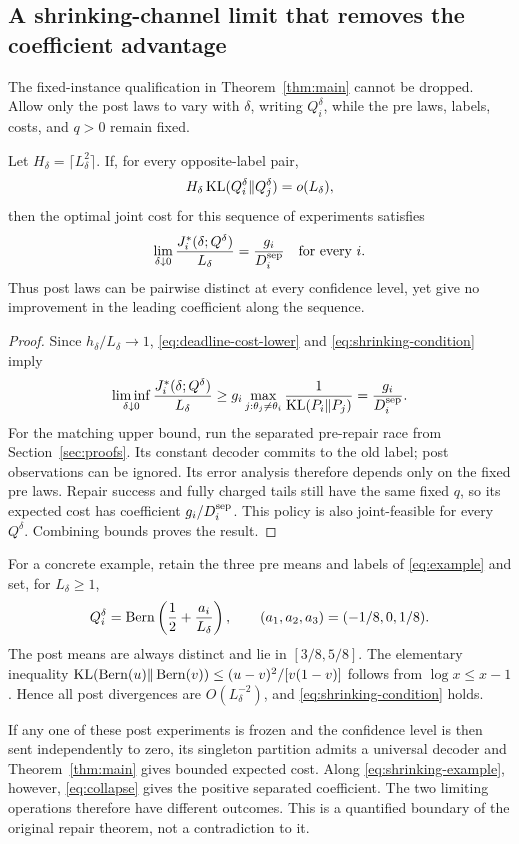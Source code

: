 \subsection{A shrinking-channel limit that removes the coefficient advantage}
The fixed-instance qualification in Theorem~\ref{thm:main} cannot be dropped.
Allow only the post laws to vary with $\delta$, writing $Q_i^\delta$, while
the pre laws, labels, costs, and $q>0$ remain fixed.

\begin{theorem}
\label{thm:collapse}
Let $H_\delta=\lceil L_\delta^2\rceil$. If, for every opposite-label pair,
\begin{equation}
H_\delta\operatorname{KL}(Q_i^\delta\Vert Q_j^\delta)=o(L_\delta),
\label{eq:shrinking-condition}
\end{equation}
then the optimal joint cost for this sequence of experiments satisfies
\begin{equation}
\lim_{\delta\downarrow0}\frac{J_i^*(\delta;Q^\delta)}{L_\delta}
=\frac{g_i}{D_i^{\rm sep}}\quad\text{for every }i.
\label{eq:collapse}
\end{equation}
Thus post laws can be pairwise distinct at every confidence level, yet give
no improvement in the leading coefficient along the sequence.
\end{theorem}
\begin{proof}
Since $h_\delta/L_\delta\to1$, \eqref{eq:deadline-cost-lower} and
\eqref{eq:shrinking-condition} imply
\[
\liminf_{\delta\downarrow0}\frac{J_i^*(\delta;Q^\delta)}{L_\delta}
\ge g_i\max_{j:\theta_j\ne\theta_i}\frac1{\operatorname{KL}(P_i\Vert P_j)}
=\frac{g_i}{D_i^{\rm sep}}.
\]
For the matching upper bound, run the separated pre-repair race from
Section~\ref{sec:proofs}. Its constant decoder commits to the old label;
post observations can be ignored. Its error analysis therefore depends only
on the fixed pre laws. Repair success and fully charged tails still have the
same fixed $q$, so its expected cost has coefficient $g_i/D_i^{\rm sep}$.
This policy is also joint-feasible for every $Q^\delta$. Combining bounds
proves the result.
\end{proof}

For a concrete example, retain the three pre means and labels of
\eqref{eq:example} and set, for $L_\delta\ge1$,
\begin{equation}
Q_i^\delta=\operatorname{Bern}\left(\frac12+\frac{a_i}{L_\delta}\right),
\qquad (a_1,a_2,a_3)=(-1/8,0,1/8).
\label{eq:shrinking-example}
\end{equation}
The post means are always distinct and lie in $[3/8,5/8]$.
The elementary inequality
$\operatorname{KL}(\operatorname{Bern}(u)\Vert\operatorname{Bern}(v))\le (u-v)^2/[v(1-v)]$
follows from $\log x\le x-1$. Hence all post divergences are
$O(L_\delta^{-2})$, and \eqref{eq:shrinking-condition} holds.

If any one of these post experiments is frozen and the confidence level is
then sent independently to zero, its singleton partition admits a universal
decoder and Theorem~\ref{thm:main} gives bounded expected cost. Along
\eqref{eq:shrinking-example}, however, \eqref{eq:collapse} gives the positive
separated coefficient. The two limiting operations therefore have different
outcomes. This is a quantified boundary of the original repair theorem, not
a contradiction to it.
